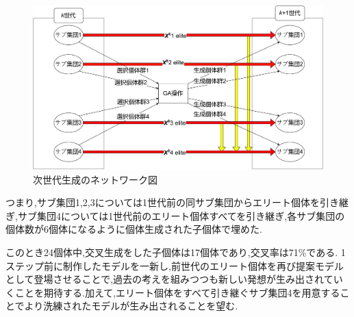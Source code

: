 \begin{table}[h]
	\centering
	\caption{$k+1$世代目の個体群\label{tb:nextSub}}
\end{table}

\begin{figure}[h]
	\begin{center}
		\includegraphics[scale=0.4]{./imgs/subFlow.pdf}
		\caption{次世代生成のネットワーク図\label{fig:subFlow}}
	\end{center}
\end{figure}
つまり,サブ集団1,2,3については1世代前の同サブ集団からエリート個体を引き継ぎ,サブ集団4については1世代前のエリート個体すべてを引き継ぎ,各サブ集団の個体数が6個体になるように個体生成された子個体で埋めた.

このとき24個体中,交叉生成をした子個体は17個体であり,交叉率は71\%である.
1ステップ前に制作したモデルを一新し,前世代のエリート個体を再び提案モデルとして登場させることで,過去の考えを組みつつも新しい発想が生み出されていくことを期待する.加えて,エリート個体をすべて引き継ぐサブ集団4を用意することでより洗練されたモデルが生み出されることを望む.

